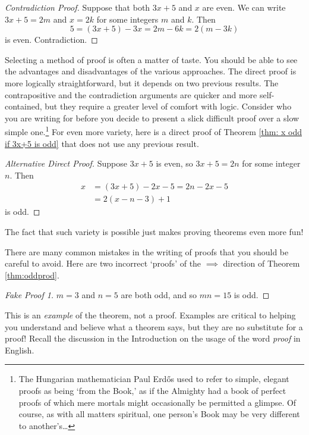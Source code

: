 \begin{proof}[Contradiction Proof] Suppose that both $3x+5$ and $x$ are even. We can write $3x+5=2m$  and $x=2k$ for some integers $m$ and $k$. Then
  \[5= (3x+5)-3x = 2m - 6k=2(m-3k)\]
  is even. Contradiction.
\end{proof}

 Selecting a method of proof is often a matter of taste. You should be able to see the advantages and disadvantages of the various approaches. The direct proof is more logically straightforward, but it depends on two previous results. The contrapositive and the contradiction arguments are quicker and more self-contained, but they require a greater level of comfort with logic. Consider who you are writing for before you decide to present a slick difficult proof over a slow simple one.\footnote{The Hungarian mathematician Paul Erdős used to refer to simple, elegant proofs as being `from the Book,' as if the Almighty had a book of perfect proofs of which mere mortals might occasionally be permitted a glimpse. Of course, as with all matters spiritual, one person's Book may be very different to another's\ldots} For even more variety, here is a direct proof of Theorem \ref{thm: x odd if 3x+5 is odd} that does not use any previous result.

\begin{proof}[Alternative Direct Proof]
Suppose $3x+5$ is even, so $3x+5=2n$ for some integer $n$. Then
\begin{align*}
x&= (3x+5)-2x-5=2n-2x-5\\
&=2(x-n-3)+1
\end{align*}
is odd.
\end{proof} 
The fact that such variety is possible just makes proving theorems even more fun!


There are many common mistakes in the writing of proofs that you should be careful to avoid. Here are two incorrect `proofs' of the $\implies$ direction of Theorem \ref{thm:oddprod}.

\begin{proof}[Fake Proof 1]
$m=3$ and $n=5$ are both odd, and so $mn=15$ is odd.
\end{proof}

 This is an \emph{example} of the theorem, not a proof. Examples are critical to helping you understand and believe what a theorem says, but they are no substitute for a proof! Recall the discussion in the Introduction on the usage of the word \emph{proof} in English.

